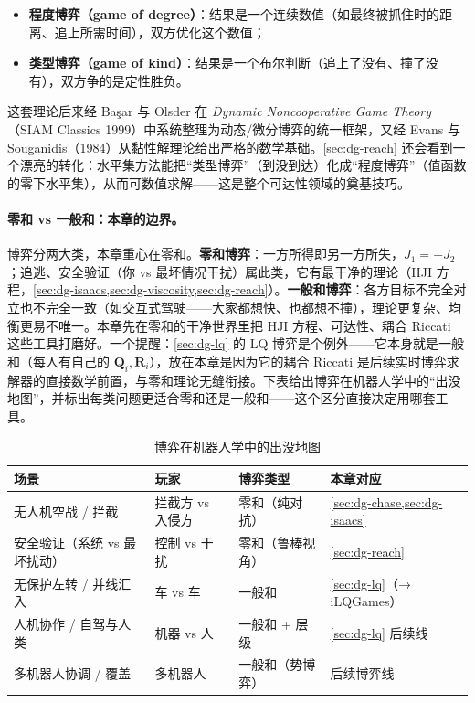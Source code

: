 \begin{itemize}
  \item \textbf{程度博弈（game of degree）}：结果是一个连续数值（如最终被抓住时的距离、追上所需时间），双方优化这个数值；
  \item \textbf{类型博弈（game of kind）}：结果是一个布尔判断（追上了没有、撞了没有），双方争的是定性胜负。
\end{itemize}

这套理论后来经 Ba\c{s}ar 与 Olsder 在 \emph{Dynamic Noncooperative Game Theory}（SIAM Classics 1999）中系统整理为动态/微分博弈的统一框架\cite{basar1999dynamic}，又经 Evans 与 Souganidis（1984）从黏性解理论给出严格的数学基础\cite{evans1984differential}。\cref{sec:dg-reach} 还会看到一个漂亮的转化：水平集方法能把“类型博弈”（到没到达）化成“程度博弈”（值函数的零下水平集），从而可数值求解——这是整个可达性领域的奠基技巧。

\paragraph{零和 vs 一般和：本章的边界。}
博弈分两大类，本章重心在零和。\textbf{零和博弈}：一方所得即另一方所失，$J_1=-J_2$；追逃、安全验证（你 vs 最坏情况干扰）属此类，它有最干净的理论（HJI 方程，\cref{sec:dg-isaacs,sec:dg-viscosity,sec:dg-reach}）。\textbf{一般和博弈}：各方目标不完全对立也不完全一致（如交互式驾驶——大家都想快、也都想不撞），理论更复杂、均衡更易不唯一。本章先在零和的干净世界里把 HJI 方程、可达性、耦合 Riccati 这些工具打磨好。一个提醒：\cref{sec:dg-lq} 的 LQ 博弈是个例外——它本身就是一般和（每人有自己的 $\mathbf Q_i,\mathbf R_i$），放在本章是因为它的耦合 Riccati 是后续实时博弈求解器的直接数学前置，与零和理论无缝衔接。下表给出博弈在机器人学中的“出没地图”，并标出每类问题更适合零和还是一般和——这个区分直接决定用哪套工具。

\begin{table}[H]\centering\small
\caption{博弈在机器人学中的出没地图}
\label{tab:dg-map}
\begin{tabular}{p{} p{} p{} p{}}
\toprule
场景 & 玩家 & 博弈类型 & 本章对应 \\
\midrule
无人机空战 / 拦截 & 拦截方 vs 入侵方 & 零和（纯对抗） & \cref{sec:dg-chase,sec:dg-isaacs} \\
安全验证（系统 vs 最坏扰动） & 控制 vs 干扰 & 零和（鲁棒视角） & \cref{sec:dg-reach} \\
无保护左转 / 并线汇入 & 车 vs 车 & 一般和 & \cref{sec:dg-lq}（→ iLQGames） \\
人机协作 / 自驾与人类 & 机器 vs 人 & 一般和 + 层级 & \cref{sec:dg-lq} 后续线 \\
多机器人协调 / 覆盖 & 多机器人 & 一般和（势博弈） & 后续博弈线 \\
\bottomrule
\end{tabular}
\end{table}

